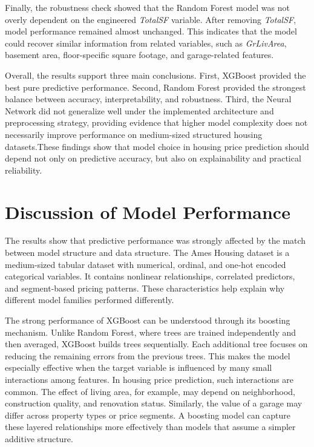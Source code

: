 \documentclass[12pt,a4paper,oneside,openany]{book}
\begin{document}
Finally, the robustness check showed that the Random Forest model was not overly dependent on the engineered \textit{TotalSF} variable. After removing \textit{TotalSF}, model performance remained almost unchanged. This indicates that the model could recover similar information from related variables, such as \textit{GrLivArea}, basement area, floor-specific square footage, and garage-related features.

Overall, the results support three main conclusions. First, XGBoost provided the best pure predictive performance. Second, Random Forest provided the strongest balance between accuracy, interpretability, and robustness. Third, the Neural Network did not generalize well under the implemented architecture and preprocessing strategy, providing evidence that higher model complexity does not necessarily improve performance on medium-sized structured housing datasets.These findings show that model choice in housing price prediction should depend not only on predictive accuracy, but also on explainability and practical reliability.


\section{Discussion of Model Performance}

The results show that predictive performance was strongly affected by the match between model structure and data structure. The Ames Housing dataset is a medium-sized tabular dataset with numerical, ordinal, and one-hot encoded categorical variables. It contains nonlinear relationships, correlated predictors, and segment-based pricing patterns. These characteristics help explain why different model families performed differently.

The strong performance of XGBoost can be understood through its boosting mechanism. Unlike Random Forest, where trees are trained independently and then averaged, XGBoost builds trees sequentially. Each additional tree focuses on reducing the remaining errors from the previous trees. This makes the model especially effective when the target variable is influenced by many small interactions among features. In housing price prediction, such interactions are common. The effect of living area, for example, may depend on neighborhood, construction quality, and renovation status. Similarly, the value of a garage may differ across property types or price segments. A boosting model can capture these layered relationships more effectively than models that assume a simpler additive structure.
\end{document}
